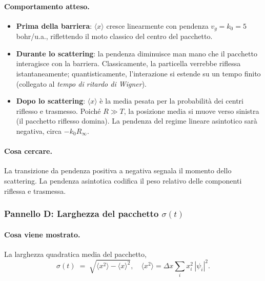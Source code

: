 \documentclass[12pt, a4paper]{article}
\newcommand{\dx}{\Delta x}
\begin{document}
\paragraph{Comportamento atteso.}
\begin{itemize}
  \item \textbf{Prima della barriera}: $\langle x\rangle$ cresce
        linearmente con pendenza $v_g = k_0 = 5$\,bohr/u.a.,
        riflettendo il moto classico del centro del pacchetto.

  \item \textbf{Durante lo scattering}: la pendenza diminuisce man
        mano che il pacchetto interagisce con la barriera.
        Classicamente, la particella verrebbe riflessa istantaneamente;
        quantisticamente, l'interazione si estende su un tempo finito
        (collegato al \emph{tempo di ritardo di Wigner}).

  \item \textbf{Dopo lo scattering}: $\langle x\rangle$ è la media
        pesata per la probabilità dei centri riflesso e trasmesso.
        Poiché $R \gg T$, la posizione media si muove verso sinistra
        (il pacchetto riflesso domina).  La pendenza del regime
        lineare asintotico sarà negativa, circa $-k_0 R_\infty$.
\end{itemize}

\paragraph{Cosa cercare.}
La transizione da pendenza positiva a negativa segnala il momento
dello scattering.  La pendenza asintotica codifica il peso relativo
delle componenti riflessa e trasmessa.

\subsubsection{Pannello D: Larghezza del pacchetto $\sigma(t)$}

\paragraph{Cosa viene mostrato.}
La larghezza quadratica media del pacchetto,
\begin{equation}
  \sigma(t) \;=\; \sqrt{\langle x^2\rangle - \langle x\rangle^2},
  \quad
  \langle x^2\rangle = \dx\sum_i x_i^2\,|\psi_i|^2.
\end{equation}
\end{document}
